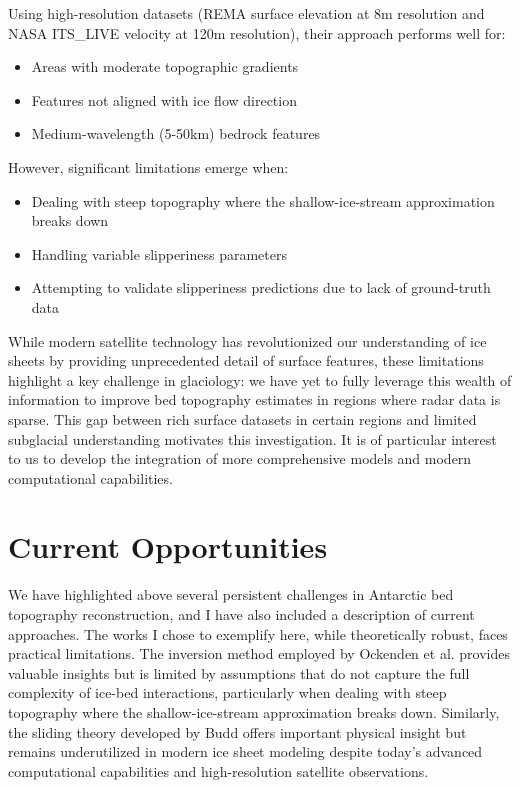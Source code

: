 Using high-resolution datasets (REMA surface elevation at 8m resolution and NASA ITS\_LIVE velocity at 120m resolution), their approach performs well for:
\begin{itemize}
    \item Areas with moderate topographic gradients
    \item Features not aligned with ice flow direction
    \item Medium-wavelength (5-50km) bedrock features
\end{itemize}

However, significant limitations emerge when:
\begin{itemize}
    \item Dealing with steep topography where the shallow-ice-stream approximation breaks down
    \item Handling variable slipperiness parameters
    \item Attempting to validate slipperiness predictions due to lack of ground-truth data
\end{itemize}

While modern satellite technology has revolutionized our understanding of ice sheets by providing unprecedented detail of surface features, these limitations highlight a key challenge in glaciology: we have yet to fully leverage this wealth of information to improve bed topography estimates in regions where radar data is sparse. This gap between rich surface datasets in certain regions and limited subglacial understanding motivates this investigation. It is of particular interest to us to develop the integration of more comprehensive models and modern computational capabilities.


\section{Current Opportunities}

We have highlighted above several persistent challenges in Antarctic bed topography reconstruction, and I have also included a description of current approaches. The works I chose to exemplify here, while theoretically robust, faces practical limitations. The inversion method employed by Ockenden et al. provides valuable insights but is limited by assumptions that do not capture the full complexity of ice-bed interactions, particularly when dealing with steep topography where the shallow-ice-stream approximation breaks down. Similarly, the sliding theory developed by Budd offers important physical insight but remains underutilized in modern ice sheet modeling despite today's advanced computational capabilities and high-resolution satellite observations.

